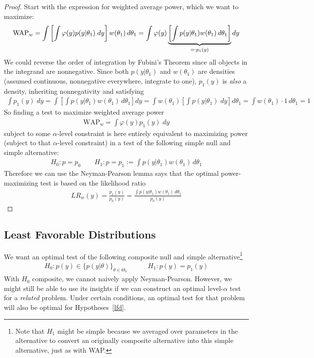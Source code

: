 \documentclass[12pt]{article}
\theoremstyle{plain}
\theoremstyle{definition}
\theoremstyle{remark}
\begin{document}
\clearpage
\begin{proof}
Start with the expression for weighted average power, which we want to
maximize:
\begin{align*}
  \text{WAP}_w
  =
  \int
  \left[
  \int
  \varphi(y)p(y|\theta_1)\;dy
  \right]
  w(\theta_1)
  \, d\theta_1
  =
  \int
  \varphi(y)
  \underbrace{%
  \left[
  \int
    p(y|\theta_1)
    w(\theta_1)
    \, d\theta_1
  \right]
  }_{=:p_1(y)}
  dy
\end{align*}
We could reverse the order of integration by Fubini's Theorem since all
objects in the integrand are nonnegative.
Since both $p(y|\theta_1)$ and $w(\theta_1)$ are densities
(assumed continuous, nonnegative everywhere, integrate to one), $p_1(y)$
is \emph{also} a density, inheriting nonnegativity and satisfying
\begin{align*}
  \int p_1(y)\; dy
  =
  \int
  \left[
  \int
    p(y|\theta_1)
    w(\theta_1)
    \, d\theta_1
  \right]
  dy
  =
  \int
  w(\theta_1)
  \left[
  \int
    p(y|\theta_1)
  \; dy
  \right]
  d\theta_1
  =
  \int
  w(\theta_1)
  \cdot 1
  \, d\theta_1
  = 1
\end{align*}
So finding a test to maximize weighted average power
\begin{align*}
  \text{WAP}_w
  =
  \int \varphi(y) p_1(y) \; dy
\end{align*}
subject to some $\alpha$-level constraint is here entirely equivalent to
maximizing power (subject to that $\alpha$-level constraint) in a test
of the following simple null and simple alternative:
\begin{align*}
  H_0: p = p_0
  \qquad
  H_1: p = p_1 :=
  \int p(y|\theta_1) w(\theta_1) \, d\theta_1
\end{align*}
Therefore we can use the Neyman-Pearson lemma says that the optimal
power-maximizing test is based on the likelihood ratio
\begin{align*}
  LR_w(y)
  = \frac{p_1(y)}{p_0(y)}
  = \frac{\int p(y|\theta_1) w(\theta_1) \,
  d\theta_1}{p_0(y)}
\end{align*}
\end{proof}


\clearpage
\subsection{Least Favorable Distributions}

We want an optimal test of the following composite null and simple
alternative\footnote{%
  Note that $H_1$ might be simple because we averaged over parameters in
  the alternative to convert an originally composite alternative into
  this simple alternative, just as with WAP.
}
\begin{align}
  H_0:
  p(y) \in \big\{p(y|\theta)\big\}_{\theta\in\Theta_0}
  \qquad\quad
  H_1: p(y) = p_1(y)
  \label{lfd}
\end{align}
With $H_0$ composite, we cannot naively apply Neyman-Pearson.
However, we might still be able to use its insights if we can construct
an optimal level-$\alpha$ test for a \emph{related} problem.
Under certain conditions, an optimal test for that problem will also be
optimal for Hypotheses~\ref{lfd}.
\end{document}
